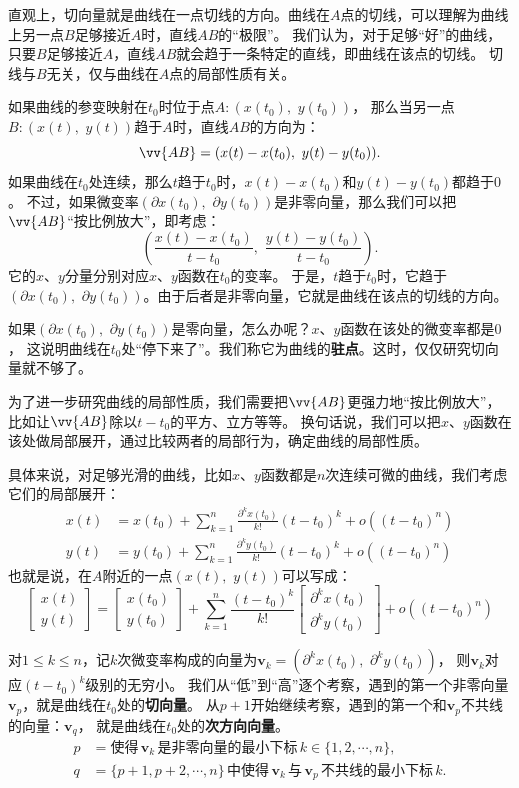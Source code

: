 \documentclass[12pt,UTF8]{ctexbook}
\newcommand{\olim}[1]{\mathit{o}\left(#1\right)}  %
\theoremstyle{definition}
\theoremstyle{plain}
\begin{document}
直观上，切向量就是曲线在一点切线的方向。曲线在$A$点的切线，可以理解为曲线上另一点$B$足够接近$A$时，直线$AB$的“极限”。
我们认为，对于足够“好”的曲线，只要$B$足够接近$A$，直线$AB$就会趋于一条特定的直线，即曲线在该点的切线。
切线与$B$无关，仅与曲线在$A$点的局部性质有关。

如果曲线的参变映射在$t_0$时位于点$A:(x(t_0),\,\, y(t_0))$，
那么当另一点$B:(x(t),\,\, y(t))$趋于$A$时，直线$AB$的方向为：
$$ \vv{AB} = (x(t) - x(t_0),\,\, y(t) - y(t_0)). $$
如果曲线在$t_0$处连续，那么$t$趋于$t_0$时，$x(t) - x(t_0)$和$y(t) - y(t_0)$都趋于$0$。
不过，如果微变率$(\partial x(t_0),\,\,\partial y(t_0))$是非零向量，那么我们可以把$\vv{AB}$“按比例放大”，即考虑：
$$ \left(\frac{x(t) - x(t_0)}{t - t_0},\,\, \frac{y(t) - y(t_0)}{t - t_0}\right).$$
它的$x$、$y$分量分别对应$x$、$y$函数在$t_0$的变率。
于是，$t$趋于$t_0$时，它趋于$(\partial x(t_0),\,\,\partial y(t_0))$。由于后者是非零向量，它就是曲线在该点的切线的方向。

如果$(\partial x(t_0),\,\,\partial y(t_0))$是零向量，怎么办呢？$x$、$y$函数在该处的微变率都是$0$，
这说明曲线在$t_0$处“停下来了”。我们称它为曲线的\textbf{驻点}。这时，仅仅研究切向量就不够了。

为了进一步研究曲线的局部性质，我们需要把$\vv{AB}$更强力地“按比例放大”，比如让$\vv{AB}$除以$t - t_0$的平方、立方等等。
换句话说，我们可以把$x$、$y$函数在该处做局部展开，通过比较两者的局部行为，确定曲线的局部性质。

具体来说，对足够光滑的曲线，比如$x$、$y$函数都是$n$次连续可微的曲线，我们考虑它们的局部展开：
\begin{align*}
    x(t) &= x(t_0) + \sum_{k=1}^n \frac{\partial^k x (t_0)}{k!}(t - t_0)^k + \olim{(t - t_0)^n} \\
    y(t) &= y(t_0) + \sum_{k=1}^n \frac{\partial^k y (t_0)}{k!}(t - t_0)^k + \olim{(t - t_0)^n}
\end{align*}
也就是说，在$A$附近的一点$(x(t),\,\, y(t))$可以写成：
$$
\begin{bmatrix}
    x(t) \\ y(t)
\end{bmatrix}
=
\begin{bmatrix}
    x(t_0) \\ y(t_0)
\end{bmatrix}
+
\sum_{k=1}^n \frac{(t - t_0)^k}{k!}
\begin{bmatrix}
    \partial^k x(t_0) \\ \partial^k y(t_0)
\end{bmatrix}
+
\olim{(t - t_0)^n}
$$

对$1\leqslant k\leqslant n$，记$k$次微变率构成的向量为$\mathbf{v}_k = (\partial^k x(t_0) ,\,\, \partial^k y(t_0))$，
则$\mathbf{v}_k$对应$(t - t_0)^k$级别的无穷小。
我们从“低”到“高”逐个考察，遇到的第一个非零向量$\mathbf{v}_p$，就是曲线在$t_0$处的\textbf{切向量}。
从$p+1$开始继续考察，遇到的第一个和$\mathbf{v}_p$不共线的向量：$\mathbf{v}_q$，
就是曲线在$t_0$处的\textbf{次方向向量}。
\begin{align*}
    p &= \mbox{使得}\,\mathbf{v}_k\,\mbox{是非零向量的最小下标}\,k\in\{1,2,\cdots, n\}, \\
    q &= \{p+1,p+2,\cdots, n\}\,\mbox{中使得}\,\mathbf{v}_k\,\mbox{与}\,\mathbf{v}_p\,\mbox{不共线的最小下标}\, k. 
\end{align*}
\end{document}
